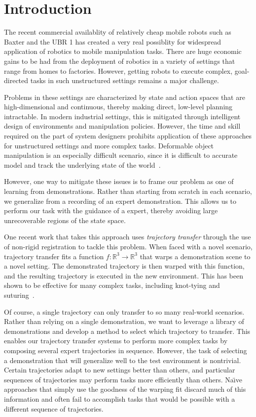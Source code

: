 \section{Introduction}
The recent commercial availablity of relatively cheap mobile robots such as Baxter and the UBR 1 
has created a very real possiblity for widespread application of robotics to mobile manipulation tasks.
There are huge economic gains to be had from the deployment of robotics in a variety of settings that range from homes to factories.
However, getting robots to execute complex, goal-directed tasks in such unstructured settings remains a major challenge.

Problems in these settings are characterized by state and action spaces that are high-dimensional and continuous, thereby making direct, low-level planning intractable.
In modern industrial settings, this is mitigated through intelligent design of environments and manipulation policies.
However, the time and skill required on the part of system designers prohibits application of these approaches for unstructured settings and more complex tasks.
Deformable object manipulation is an especially difficult scenario, since it is difficult to accurate model and track the underlying state of the world~\cite{SchulmanLeeHoAbbeel_ICRA2013,Javdanietal_2011,Haehnel03a}.

However, one way to mitigate these issues is to frame our problem as one of learning from demonstrations.
Rather than starting from scratch in each scenario, we generalize from a recording of an expert demonstration.
This allows us to perform our task with the guidance of a expert, thereby avoiding large unrecoverable regions of the state space.

One recent work that takes this approach uses \emph{trajectory transfer} through the use of non-rigid registration to tackle this problem.
When faced with a novel scenario, trajectory transfer fits a function $f:\mathbb{R}^3 \rightarrow \mathbb{R}^3$ that warps a demonstration scene to a novel setting.
The demonstrated trajectory is then warped with this function, and the resulting trajectory is executed in the new environment.
This has been shown to be effective for many complex tasks, including knot-tying and suturing~\cite{Schulmanetal_ISRR2013, Schulmanetal_IROS2013}.

Of course, a single trajectory can only transfer to so many real-world scenarios.
Rather than relying on a single demonstration, we want to leverage a library of demonstrations and develop a method to select which trajectory to transfer.
This enables our trajectory transfer systems to perform more complex tasks by composing several expert trajectories in sequence.
However, the task of selecting a demonstration that will generalize well to the test environment is nontrivial.
Certain trajectories adapt to new settings better than others, and particular sequences of trajectories may perform tasks more efficiently than others.
Na\"{\i}ve approaches that simply use the goodness of the warping fit discard much of this information and often fail to accomplish tasks that would be possible with a different sequence of trajectories.


